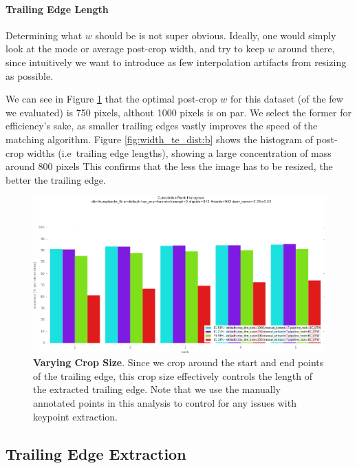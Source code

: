 \paragraph{Trailing Edge Length}

Determining what $w$ should be is not super obvious.
Ideally, one would simply look at the mode or average post-crop width, and try to keep $w$ around there, since intuitively we want to introduce as few interpolation artifacts from resizing as possible.

We can see in Figure \ref{fig:vary_crop_size} that the optimal post-crop $w$ for this dataset (of the few we evaluated) is 750 pixels, althout 1000 pixels is on par.
We select the former for efficiency's sake, as smaller trailing edges vastly improves the speed of the matching algorithm.
Figure \ref{fig:width_te_dist:b} shows the histogram of post-crop widths (i.e\ trailing edge lengths), showing a large concentration of mass around 800 pixels 
This confirms that the less the image has to be resized, the better the trailing edge.

\begin{figure}[t]%
\centering
\includegraphics[width=1\textwidth]{../images/results/vary_crop_size.png}
\caption{\textbf{Varying Crop Size}. Since we crop around the start and end points of the trailing edge, this crop size effectively controls the length of the extracted trailing edge. Note that we use the manually annotated points in this analysis to control for any issues with keypoint extraction.}
\label{fig:vary_crop_size}
\end{figure}


\subsection{Trailing Edge Extraction}

